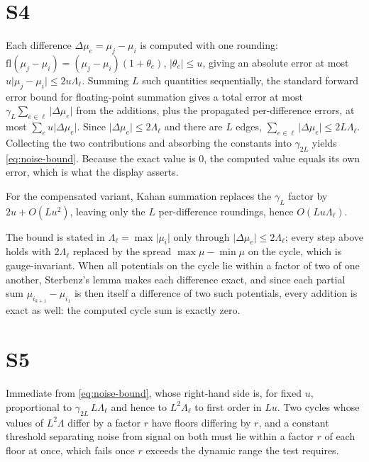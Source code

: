 \documentclass[11pt,a4paper]{article}
\theoremstyle{definition}
\theoremstyle{remark}
\newcommand{\abs}[1]{\lvert#1\rvert}
\newcommand{\mach}{u}
\begin{document}
\section*{S4}
Each difference $\Delta\mu_e = \mu_j-\mu_i$ is computed with one
rounding: $\mathrm{fl}(\mu_j-\mu_i) = (\mu_j-\mu_i)(1+\theta_e)$,
$\abs{\theta_e}\le\mach$, giving an absolute error at most
$\mach\abs{\mu_j-\mu_i}\le 2\mach\Lambda_\ell$. Summing $L$ such
quantities sequentially, the standard forward error bound for
floating-point summation \citep[Ch.~4]{higham2002} gives a total error
at most $\gamma_{L}\sum_{e\in\ell}\abs{\Delta\mu_e}$ from the additions,
plus the propagated per-difference errors, at most
$\sum_{e}\mach\abs{\Delta\mu_e}$. Since
$\abs{\Delta\mu_e}\le 2\Lambda_\ell$ and there are $L$ edges,
$\sum_{e\in\ell}\abs{\Delta\mu_e}\le 2L\Lambda_\ell$. Collecting the two
contributions and absorbing the constants into $\gamma_{2L}$ yields
\eqref{eq:noise-bound}. Because the exact value is $0$, the computed
value equals its own error, which is what the display asserts.

For the compensated variant, Kahan summation \citep{kahan1965,
higham2002} replaces the $\gamma_L$ factor by $2\mach + O(L\mach^{2})$,
leaving only the $L$ per-difference roundings, hence
$O(L\mach\Lambda_\ell)$.

The bound is stated in $\Lambda_\ell=\max\abs{\mu_i}$ only through
$\abs{\Delta\mu_e}\le 2\Lambda_\ell$; every step above holds with
$2\Lambda_\ell$ replaced by the spread $\max\mu-\min\mu$ on the cycle,
which is gauge-invariant. When all potentials on the cycle lie within a
factor of two of one another, Sterbenz's lemma \citep{goldberg1991} makes
each difference exact, and since each partial sum
$\mu_{i_{k+1}}-\mu_{i_1}$ is then itself a difference of two such
potentials, every addition is exact as well: the computed cycle sum is
exactly zero.

\section*{S5}
Immediate from \eqref{eq:noise-bound}, whose right-hand side is, for
fixed $\mach$, proportional to $\gamma_{2L}\,L\Lambda_\ell$ and hence to
$L^{2}\Lambda_\ell$ to first order in $L\mach$. Two cycles whose values of
$L^{2}\Lambda$ differ by a factor $r$ have floors differing by $r$, and
a constant threshold separating noise from signal on both must lie
within a factor $r$ of each floor at once, which fails once $r$ exceeds
the dynamic range the test requires.
\end{document}
